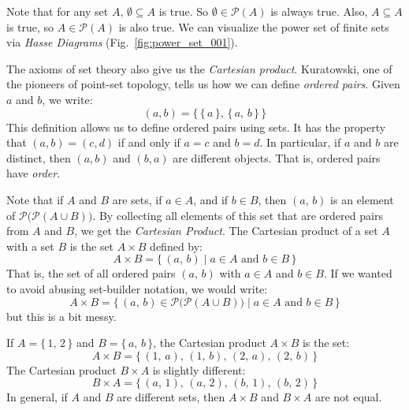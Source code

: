 \documentclass{article}
\theoremstyle{plain}
\theoremstyle{normal}
\newenvironment{example}{%
    \pushQED{\qed}\renewcommand{\qedsymbol}{$\blacksquare$}\examplex%
}{%
    \popQED\endexamplex%
}
\newenvironment{definition}{%
    \pushQED{\qed}\renewcommand{\qedsymbol}{$\blacksquare$}\definitionx%
}{%
    \popQED\enddefinitionx%
}
\begin{document}
        Note that for any set $A$, $\emptyset\subseteq{A}$ is true. So
        $\emptyset\in\mathcal{P}(A)$ is always true. Also, $A\subseteq{A}$
        is true, so $A\in\mathcal{P}(A)$ is also true. We can visualize the
        power set of finite sets via \textit{Hasse Diagrams}
        (Fig.~\ref{fig:power_set_001}).
        \par\hfill\par
        The axioms of set theory also give us the \textit{Cartesian product}.
        Kuratowski, one of the pioneers of point-set topology, tells us how
        we can define \textit{ordered pairs}. Given $a$ and $b$, we write:
        \begin{equation}
            (a,b)=\big\{\,\{\,a\,\},\,\{\,a,\,b\,\}\,\big\}
        \end{equation}
        This definition allows us to define ordered pairs using sets. It has
        the property that $(a,b)=(c,d)$ if and only if $a=c$ and $b=d$. In
        particular, if $a$ and $b$ are distinct, then $(a,b)$ and $(b,a)$ are
        different objects. That is, ordered pairs have \textit{order}.
        \par\hfill\par
        Note that if $A$ and $B$ are sets, if $a\in{A}$, and if $b\in{B}$, then
        $(a,\,b)$ is an element of $\mathcal{P}\big(\mathcal{P}(A\cup{B})\big)$.
        By collecting all elements of this set that are ordered pairs from $A$
        and $B$, we get the \textit{Cartesian Product}.
        \begin{definition}[\textbf{Cartesian Product}]
            The Cartesian product of a set $A$ with a set $B$ is the set
            $A\times{B}$ defined by:
            \begin{equation}
                A\times{B}=\{\,(a,\,b)\;|\;a\in{A}\textrm{ and }b\in{B}\,\}
            \end{equation}
            That is, the set of all ordered pairs $(a,\,b)$ with $a\in{A}$ and
            $b\in{B}$.
        \end{definition}
        If we wanted to avoid abusing set-builder notation, we would write:
        \begin{equation}
            A\times{B}=\{\,
                (a,\,b)\in\mathcal{P}\big(\mathcal{P}(A\cup{B})\big)\;|\;
                    a\in{A}\textrm{ and }b\in{B}\,\}
        \end{equation}
        but this is a bit messy.
        \begin{example}
            If $A=\{\,1,\,2\,\}$ and $B=\{\,a,\,b\,\}$, the Cartesian product
            $A\times{B}$ is the set:
            \begin{equation}
                A\times{B}=\{\,(1,\,a),\,(1,\,b),\,(2,\,a),\,(2,\,b)\,\}
            \end{equation}
            The Cartesian product $B\times{A}$ is slightly different:
            \begin{equation}
                B\times{A}=\{\,(a,\,1),\,(a,\,2),\,(b,\,1),\,(b,\,2)\,\}
            \end{equation}
            In general, if $A$ and $B$ are different sets, then $A\times{B}$
            and $B\times{A}$ are not equal.
        \end{example}
\end{document}

